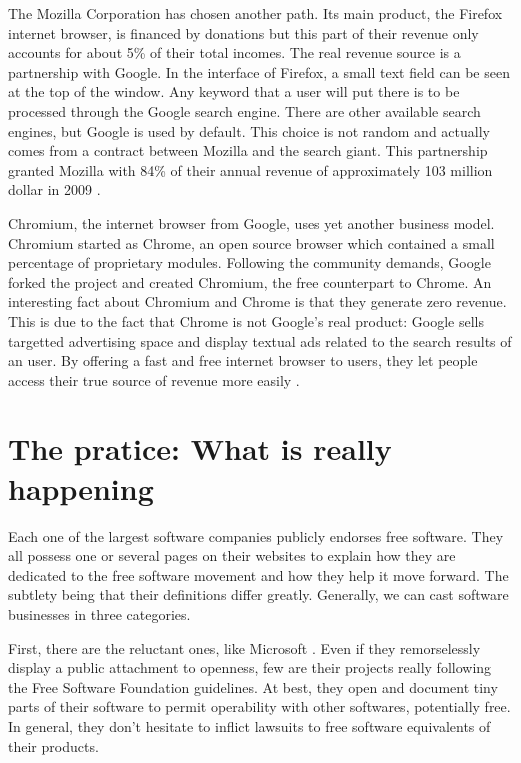 \documentclass[12pt]{article}
\begin{document}
The Mozilla Corporation has chosen another path. Its main product, the
Firefox internet browser, is financed by donations but this part of
their revenue only accounts for about 5\% of their total incomes. The
real revenue source is a partnership with Google. In the interface of
Firefox, a small text field can be seen at the top of the window. Any
keyword that a user will put there is to be processed through the
Google search engine. There are other available search engines, but
Google is used by default. This choice is not random and actually
comes from a contract between Mozilla and the search giant. This
partnership granted Mozilla with 84\% of their annual revenue of
approximately 103 million dollar in 2009 \cite{moz}.

Chromium, the internet browser from Google, uses yet another business
model. Chromium started as Chrome, an open source browser which
contained a small percentage of proprietary modules. Following the
community demands, Google forked the project and created Chromium, the
free counterpart to Chrome. An interesting fact about Chromium and
Chrome is that they generate zero revenue. This is due to the fact
that Chrome is not Google's real product: Google sells targetted
advertising space and display textual ads related to the search
results of an user. By offering a fast and free internet browser to
users, they let people access their true source of revenue more easily
\cite{shuttle}.

\section{The pratice: What is really happening}

Each one of the largest software companies publicly endorses free
software. They all possess one or several pages on their websites to
explain how they are dedicated to the free software movement and how
they help it move forward. The subtlety being that their definitions
differ greatly. Generally, we can cast software businesses in three
categories.

First, there are the reluctant ones, like Microsoft \cite{woss}. Even
if they remorselessly display a public attachment to openness, few are
their projects really following the Free Software Foundation
guidelines. At best, they open and document tiny parts of their
software to permit operability with other softwares, potentially
free. In general, they don't hesitate to inflict lawsuits to free
software equivalents of their products.
\end{document}
